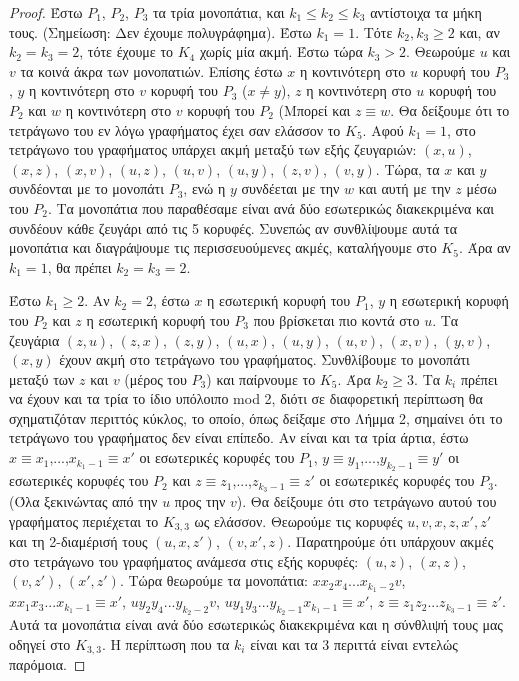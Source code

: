 \documentclass[a4paper, oneside, 11pt]{article}
\theoremstyle{definition}
\begin{document}
\begin{enumerate}
\begin{proof}
Έστω $P_1$, $P_2$, $P_3$ τα τρία μονοπάτια, και $k_1\leq k_2\leq k_3$ αντίστοιχα τα μήκη τους. (Σημείωση: Δεν έχουμε πολυγράφημα). Έστω $k_1=1$. Τότε $k_2,k_3\geq 2$ και, αν $k_2=k_3=2$, τότε 
έχουμε το $K_4$ χωρίς μία ακμή. Έστω τώρα $k_3>2$. Θεωρούμε $u$ και $v$ τα κοινά άκρα των μονοπατιών. Επίσης έστω $x$ η κοντινότερη στο $u$ κορυφή του $P_3$, $y$ η κοντινότερη στο $v$ 
κορυφή του $P_3$ ($x\neq y$), $z$
η κοντινότερη στο $u$ κορυφή του $P_2$ και $w$ η κοντινότερη στο $v$ κορυφή του $P_2$ (Μπορεί και $z\equiv w$. 
Θα δείξουμε ότι το τετράγωνο του εν λόγω γραφήματος έχει σαν ελάσσον το $K_5$. Αφού $k_1=1$, στο τετράγωνο του γραφήματος υπάρχει ακμή μεταξύ των εξής ζευγαριών:
$(x,u)$, $(x,z)$, $(x,v)$, $(u,z)$, $(u,v)$, $(u,y)$, $(z,v)$, $(v,y)$. Τώρα, τα $x$ και $y$ συνδέονται με το μονοπάτι $P_3$, ενώ η $y$ συνδέεται με την $w$ και αυτή με την $z$ μέσω του $P_2$. Τα
μονοπάτια που παραθέσαμε είναι ανά δύο εσωτερικώς διακεκριμένα και συνδέουν κάθε ζευγάρι από τις 5 κορυφές. Συνεπώς αν συνθλίψουμε αυτά τα μονοπάτια και διαγράψουμε τις περισσευούμενες ακμές,
καταλήγουμε στο $K_5$. Άρα αν $k_1=1$, θα πρέπει $k_2=k_3=2$. 

Έστω $k_1\geq 2$. Αν $k_2=2$, έστω $x$ η εσωτερική κορυφή του $P_1$, $y$ η εσωτερική κορυφή του $P_2$ και $z$ η εσωτερική κορυφή του $P_3$ που βρίσκεται πιο κοντά στο $u$.
Τα ζευγάρια $(z,u)$, $(z,x)$, $(z,y)$, $(u,x)$, $(u,y)$, $(u,v)$, $(x,v)$, $(y,v)$, $(x,y)$ έχουν ακμή στο τετράγωνο του γραφήματος. Συνθλίβουμε το μονοπάτι μεταξύ των $z$ και $v$ (μέρος του $P_3$) και
παίρνουμε το $K_5$. Άρα $k_2\geq 3$.
Τα $k_i$ πρέπει να έχουν και τα τρία το ίδιο υπόλοιπο mod 2, διότι σε διαφορετική περίπτωση
θα σχηματιζόταν περιττός κύκλος, το οποίο, όπως δείξαμε στο Λήμμα 2, σημαίνει ότι το τετράγωνο του γραφήματος δεν είναι επίπεδο. Αν είναι και τα τρία άρτια, έστω $x\equiv x_1$,...,$x_{k_1-1}\equiv x'$ 
οι εσωτερικές κορυφές του $P_1$, $y\equiv y_1$,...,$y_{k_2-1}\equiv y'$ οι εσωτερικές κορυφές του $P_2$ και $z\equiv z_1$,...,$z_{k_3-1}\equiv z'$ οι εσωτερικές κορυφές του $P_3$. 
(Όλα ξεκινώντας από την $u$ προς την $v$). Θα δείξουμε ότι στο τετράγωνο αυτού του γραφήματος περιέχεται το $K_{3,3}$ ως ελάσσον. Θεωρούμε τις κορυφές ${u,v,x,z,x',z'}$ και τη 2-διαμέρισή τους
$(u,x,z')$, $(v,x',z)$. Παρατηρούμε ότι υπάρχουν ακμές στο τετράγωνο του γραφήματος ανάμεσα στις εξής κορυφές: $(u,z)$, $(x,z)$, $(v,z')$, $(x',z')$. Τώρα θεωρούμε τα μονοπάτια: 
$x x_2 x_4 ... x_{k_1 -2} v$, $x x_1 x_3 ... x_{k_1 -1}\equiv x'$, $u y_2 y_4 ... y_{k_2 -2} v$, $u y_1 y_3 ... y_{k_2-1} x_{k_1-1}\equiv x'$, $z\equiv z_1 z_2 ... z_{k_3-1}\equiv z'$. Αυτά τα μονοπάτια
είναι ανά δύο εσωτερικώς διακεκριμένα και η σύνθλιψή τους μας οδηγεί στο $K_{3,3}$. Η περίπτωση που τα $k_i$ είναι και τα 3 περιττά είναι εντελώς παρόμοια.


\end{proof}
\end{enumerate}
\end{document}
